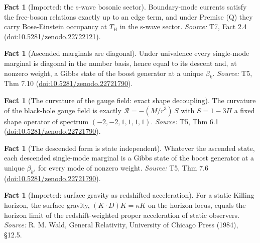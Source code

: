\documentclass[11pt]{article}
\theoremstyle{definition}
\newtheorem{fact}[theorem]{Fact}
\theoremstyle{plain}
\providecommand{\TH}{}\renewcommand{\TH}{T_{\mathrm{H}}}
\begin{document}
\begin{fact}[Imported: the s-wave bosonic sector]\label{c:hawking.imported-s-wave-bosonic-sector}
Boundary-mode currents satisfy the free-boson relations exactly up to an edge term, and under Premise (Q) they carry Bose-Einstein occupancy at $\TH$ in the s-wave sector.
\emph{Source:} T7, Fact 2.4 (\href{https://doi.org/10.5281/zenodo.22722121}{doi:10.5281/zenodo.22722121}).
\end{fact}

\begin{fact}[Ascended marginals are diagonal]\label{c:singularity.ascended-marginals-are-diagonal}
Under univalence every single-mode marginal is diagonal in the number basis, hence equal to its descent and, at nonzero weight, a Gibbs state of the boost generator at a unique $\beta_k$.
\emph{Source:} T5, Thm 7.10 (\href{https://doi.org/10.5281/zenodo.22721790}{doi:10.5281/zenodo.22721790}).
\end{fact}

\begin{fact}[The curvature of the gauge field: exact shape decoupling]\label{c:singularity.curvature-gauge-field-exact-shape-decoupling}
The curvature of the black-hole gauge field is exactly $\mathcal{R} = -(M/r^3)\,S$ with $S = 1 - 3\Pi$ a fixed shape operator of spectrum $(-2,-2,1,1,1,1)$.
\emph{Source:} T5, Thm 6.1 (\href{https://doi.org/10.5281/zenodo.22721790}{doi:10.5281/zenodo.22721790}).
\end{fact}

\begin{fact}[The descended form is state independent]\label{c:singularity.descended-form-state-independent}
Whatever the ascended state, each descended single-mode marginal is a Gibbs state of the boost generator at a unique $\beta_k$, for every mode of nonzero weight.
\emph{Source:} T5, Thm 7.6 (\href{https://doi.org/10.5281/zenodo.22721790}{doi:10.5281/zenodo.22721790}).
\end{fact}

\begin{fact}[Imported: surface gravity as redshifted acceleration]\label{c:singularity.imported-surface-gravity-redshifted-acceleration}
For a static Killing horizon, the surface gravity, $(K \cdot D)K = \kappa K$ on the horizon locus, equals the horizon limit of the redshift-weighted proper acceleration of static observers.
\emph{Source:} R. M. Wald, General Relativity, University of Chicago Press (1984), §12.5.
\end{fact}
\end{document}
